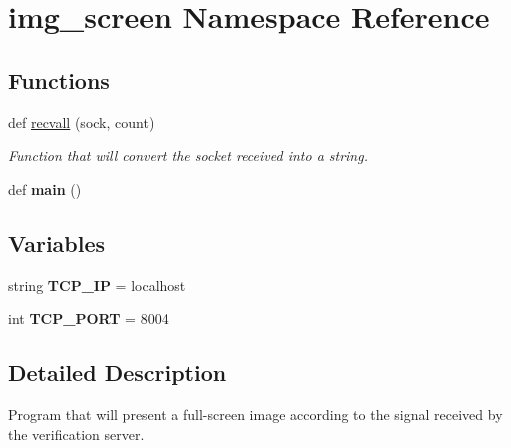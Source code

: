 \hypertarget{namespaceimg__screen}{}\section{img\+\_\+screen Namespace Reference}
\label{namespaceimg__screen}
\subsection*{Functions}
\begin{DoxyCompactItemize}
\item 
def \hyperlink{namespaceimg__screen_acd79c234758f2fce61010e92079132f0}{recvall} (sock, count)
\begin{DoxyCompactList}\small\item\em Function that will convert the socket received into a string. \end{DoxyCompactList}\item 
def {\bfseries main} ()\hypertarget{namespaceimg__screen_a8b8effa7bd8a1c4faa77a39336eabdd4}{}\label{namespaceimg__screen_a8b8effa7bd8a1c4faa77a39336eabdd4}

\end{DoxyCompactItemize}
\subsection*{Variables}
\begin{DoxyCompactItemize}
\item 
string {\bfseries T\+C\+P\+\_\+\+IP} = \textquotesingle{}localhost\textquotesingle{}\hypertarget{namespaceimg__screen_a4ff0562588b8f821d56dc8c337a8002f}{}\label{namespaceimg__screen_a4ff0562588b8f821d56dc8c337a8002f}

\item 
int {\bfseries T\+C\+P\+\_\+\+P\+O\+RT} = 8004\hypertarget{namespaceimg__screen_abb1cc73fc386a79c181d62ea05038068}{}\label{namespaceimg__screen_abb1cc73fc386a79c181d62ea05038068}

\end{DoxyCompactItemize}


\subsection{Detailed Description}
\begin{DoxyVerb}Program that will present a full-screen image according to the signal received by the verification server.
\end{DoxyVerb}
 

